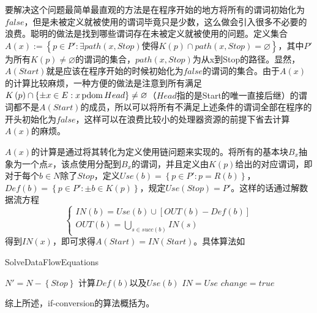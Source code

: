 要解决这个问题最简单最直观的方法是在程序开始的地方将所有的谓词初始化为$false$，但是未被定义就被使用的谓词毕竟只是少数，这么做会引入很多不必要的浪费。聪明的做法是找到哪些谓词存在未被定义就被使用的问题。定义集合$A\left(x\right):=\left\{p\in P': \exists path\left(x,Stop\right)\text{使得}K\left(p\right)\cap path\left(x,Stop\right)=\varnothing\right\}$，其中$P'$为所有$K\left(p\right)\neq\varnothing$的谓词的集合，$path\left(x,Stop\right)$为从x到Stop的路径。显然，$A\left(Start\right)$就是应该在程序开始的时候初始化为$false$的谓词的集合。由于$A\left(x\right)$的计算比较麻烦，一种方便的做法是注意到所有满足$K\left(p\right)\cap\left\{\pm x\in E:x \,\mathrm{pdom}\, Head\right\}\neq\varnothing$（$Head$指的是Start的唯一直接后继）的谓词都不是$A\left(Start\right)$的成员，所以可以将所有不满足上述条件的谓词全部在程序的开头初始化为$false$，这样可以在浪费比较小的处理器资源的前提下省去计算$A\left(x\right)$的麻烦。

$A\left(x\right)$的计算是通过将其转化为定义使用链问题来实现的。将所有的基本块$B_x$抽象为一个点$x$，该点使用分配到$B_x$的谓词，并且定义由$K\left(p\right)$给出的对应谓词，即对于每个$b\in N$除了$Stop$，定义$Use\left(b\right)=\left\{p\in P':p=R\left(b\right)\right\}$，$Def\left(b\right)=\left\{p\in P':\pm b \in K\left(p\right)\right\}$，规定$Use\left(Stop\right)=P'$。这样的话通过解数据流方程
\[
\left\{ \begin{array}{l}
IN\left(b\right)=Use\left(b\right)\cup\left[OUT\left(b\right)-Def\left(b\right)\right]\\
OUT\left(b\right)=\underset{s\in succ\left(b\right)}{\bigcup}IN\left(s\right)
\end{array}\right.
\]
得到$IN\left(x\right)$，即可求得$A\left(Start\right)=IN\left(Start\right)$。具体算法如

\begin{algorithm}[H]
	\label{alg:du}
	\caption{SolveDataFlowEquations}
	$N'=N-\left\{Stop\right\}$\;
	计算$Def\left(b\right)$以及$Use\left(b\right)$\;
	$IN=Use$\;
	$change=true$\;
\end{algorithm}

综上所述，if-conversion的算法概括为。

